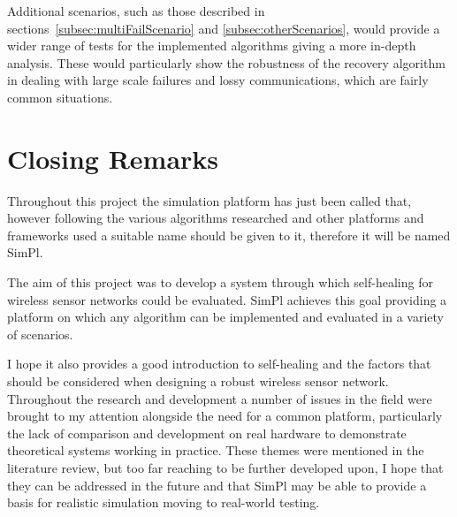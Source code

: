 \documentclass[authoryearcitations]{UoYCSproject}
\begin{document}
Additional scenarios, such as those described in sections~\ref{subsec:multiFailScenario} and \ref{subsec:otherScenarios}, would provide a wider range of tests for the implemented algorithms giving a more in-depth analysis. These would particularly show the robustness of the recovery algorithm in dealing with large scale failures and lossy communications, which are fairly common situations.

\section{Closing Remarks}

Throughout this project the simulation platform has just been called that, however following the various algorithms researched and other platforms and frameworks used a suitable name should be given to it, therefore it will be named SimPl.

The aim of this project was to develop a system through which self-healing for wireless sensor networks could be evaluated. SimPl achieves this goal providing a platform on which any algorithm can be implemented and evaluated in a variety of scenarios.

I hope it also provides a good introduction to self-healing and the factors that should be considered when designing a robust wireless sensor network. Throughout the research and development a number of issues in the field were brought to my attention alongside the need for a common platform, particularly the lack of comparison and development on real hardware to demonstrate theoretical systems working in practice. These themes were mentioned in the literature review, but too far reaching to be further developed upon, I hope that they can be addressed in the future and that SimPl may be able to provide a basis for realistic simulation moving to real-world testing.



\end{document}
